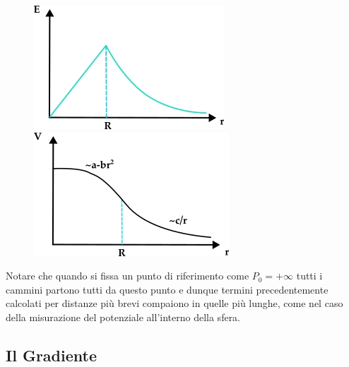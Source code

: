 \begin{figure}[!ht]
\centering
\begin{minipage}{0.4\textwidth}
  \centering
  \includegraphics[width= 0.9\linewidth]{images/gsphera}
\end{minipage}%
\hspace{0.8cm}
\begin{minipage}{0.4\textwidth}
  \centering
  \includegraphics[width=0.9\linewidth]{images/potent}
\end{minipage}
\end{figure}
Notare che quando si fissa un punto di riferimento come $P_0 = + \infty$ tutti i cammini partono tutti da questo punto e dunque termini precedentemente calcolati per distanze pi\`u brevi compaiono in quelle pi\`u lunghe, come nel caso della misurazione del potenziale all'interno della sfera.
\subsection{Il Gradiente}

